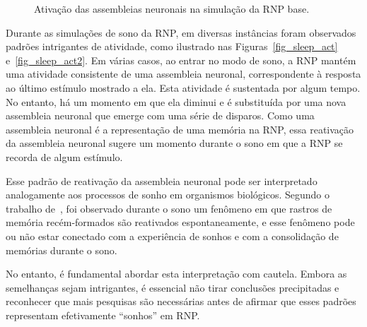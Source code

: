 \begin{figure}[!ht]
\caption{Ativação das assembleias neuronais na simulação da RNP base.}
\end{figure}

Durante as simulações de sono da RNP, em diversas instâncias foram observados padrões intrigantes de atividade, como ilustrado nas
Figuras~\ref{fig_sleep_act} e~\ref{fig_sleep_act2}. Em várias casos, ao entrar no modo de sono, a RNP mantém uma atividade
consistente de uma assembleia neuronal, correspondente à resposta ao último estímulo mostrado a ela. Esta atividade é sustentada
por algum tempo. No entanto, há um momento em que ela diminui e é substituída por uma nova assembleia neuronal que emerge com uma
série de disparos. Como uma assembleia neuronal é a representação de uma memória na RNP, essa reativação da assembleia neuronal
sugere um momento durante o sono em que a RNP se recorda de algum estímulo.

Esse padrão de reativação da assembleia neuronal pode ser interpretado analogamente aos processos de sonho em organismos
biológicos. Segundo o trabalho de~, foi observado durante o sono um fenômeno em que rastros
de memória recém-formados são reativados espontaneamente, e esse fenômeno pode ou não estar conectado com a experiência de
sonhos e com a consolidação de memórias durante o sono.

No entanto, é fundamental abordar esta interpretação com cautela. Embora as semelhanças sejam intrigantes, é essencial
não tirar conclusões precipitadas e reconhecer que mais pesquisas são necessárias antes de afirmar que esses padrões representam
efetivamente ``sonhos'' em RNP.\@

